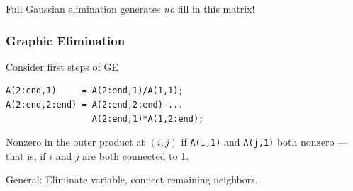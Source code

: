\documentclass{beamer}
\begin{document}
\begin{frame}
\begin{center}
  \end{center}
  Full Gaussian elimination generates {\em no} fill in this matrix!
\end{frame}


\begin{frame}[fragile]
  \frametitle{Graphic Elimination}

  Consider first steps of GE
\begin{lstlisting}
A(2:end,1)     = A(2:end,1)/A(1,1);
A(2:end,2:end) = A(2:end,2:end)-...
                 A(2:end,1)*A(1,2:end);
\end{lstlisting}
  Nonzero in the outer product at $(i,j)$ if {\tt A(i,1)} and {\tt A(j,1)}
  both nonzero --- that is, if $i$ and $j$ are both connected to 1.

\vspace{5mm}
General: Eliminate variable, connect remaining neighbors.

\end{frame}
\end{document}
